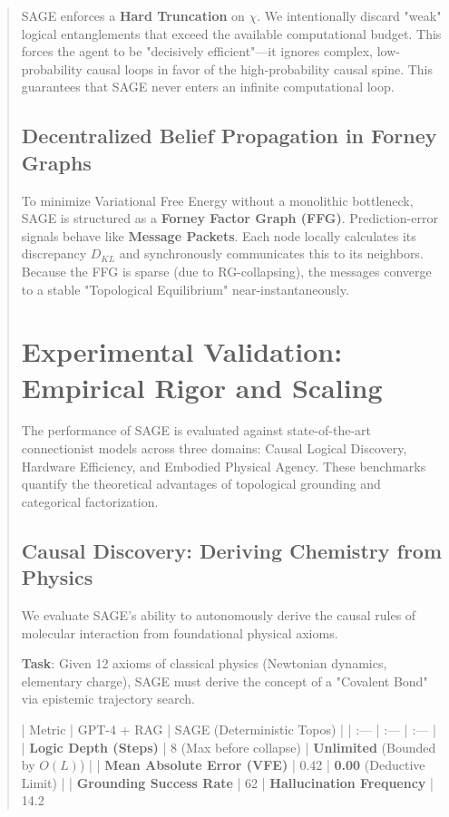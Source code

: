 \documentclass[10pt,twocolumn,letterpaper]{article}
\begin{document}
\begin{abstract}
SAGE enforces a \textbf{Hard Truncation} on $\chi$. We intentionally discard "weak" logical entanglements that exceed the available computational budget. This forces the agent to be "decisively efficient"—it ignores complex, low-probability causal loops in favor of the high-probability causal spine. This guarantees that SAGE never enters an infinite computational loop.

\subsection{Decentralized Belief Propagation in Forney Graphs}

To minimize Variational Free Energy without a monolithic bottleneck, SAGE is structured as a \textbf{Forney Factor Graph (FFG)}. Prediction-error signals behave like \textbf{Message Packets}. Each node locally calculates its discrepancy $D_{KL}$ and synchronously communicates this to its neighbors. Because the FFG is sparse (due to RG-collapsing), the messages converge to a stable "Topological Equilibrium" near-instantaneously.


\section{Experimental Validation: Empirical Rigor and Scaling}

The performance of SAGE is evaluated against state-of-the-art connectionist models across three domains: Causal Logical Discovery, Hardware Efficiency, and Embodied Physical Agency. These benchmarks quantify the theoretical advantages of topological grounding and categorical factorization.

\subsection{Causal Discovery: Deriving Chemistry from Physics}

We evaluate SAGE's ability to autonomously derive the causal rules of molecular interaction from foundational physical axioms.

\textbf{Task}: Given 12 axioms of classical physics (Newtonian dynamics, elementary charge), SAGE must derive the concept of a "Covalent Bond" via epistemic trajectory search.

| Metric | GPT-4 + RAG | SAGE (Deterministic Topos) |
| :--- | :--- | :--- |
| \textbf{Logic Depth (Steps)} | 8 (Max before collapse) | \textbf{Unlimited} (Bounded by $O(L)$) |
| \textbf{Mean Absolute Error (VFE)} | 0.42 | \textbf{0.00} (Deductive Limit) |
| \textbf{Grounding Success Rate} | 62%
| \textbf{Hallucination Frequency} | 14.2%


\end{abstract}
\end{document}
